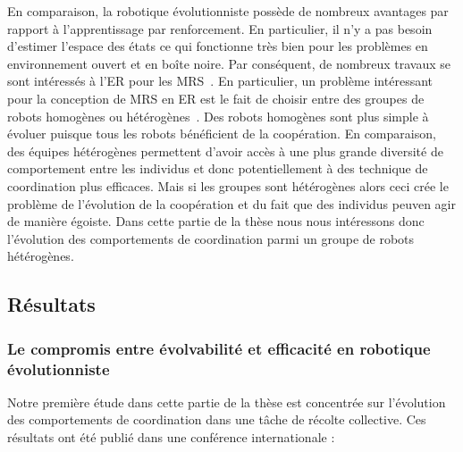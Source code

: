 		En comparaison, la robotique évolutionniste possède de nombreux avantages par rapport à l'apprentissage par renforcement. En particulier, il n'y a pas besoin d'estimer l'espace des états ce qui fonctionne très bien pour les problèmes en environnement ouvert et en boîte noire. Par conséquent, de nombreux travaux se sont intéressés à l'ER pour les MRS~\parencite{Watson2002, Brambilla2012, Hauert2014, Francesca2016}. En particulier, un problème intéressant pour la conception de MRS en ER est le fait de choisir entre des groupes de robots homogènes ou hétérogènes~\parencite{Waibel2009}. Des robots homogènes sont plus simple à évoluer puisque tous les robots bénéficient de la coopération. En comparaison, des équipes hétérogènes permettent d'avoir accès à une plus grande diversité de comportement entre les individus et donc potentiellement à des technique de coordination plus efficaces. Mais si les groupes sont hétérogènes alors ceci crée le problème de l'évolution de la coopération et du fait que des individus peuven agir de manière égoiste. Dans cette partie de la thèse nous nous intéressons donc l'évolution des comportements de coordination parmi un groupe de robots hétérogènes.

	\subsection{Résultats}

		\subsubsection{Le compromis entre évolvabilité et efficacité en robotique évolutionniste}

			Notre première étude dans cette partie de la thèse est concentrée sur l'évolution des comportements de coordination dans une tâche de récolte collective. Ces résultats ont été publié dans une conférence internationale :

			\begin{quote}
			\end{quote}

